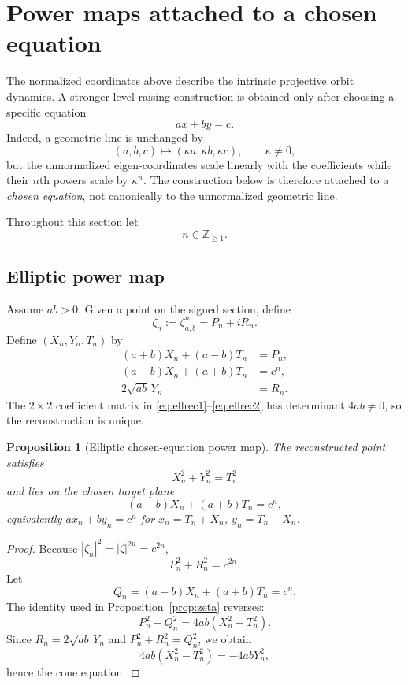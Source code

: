 \documentclass[11pt]{amsart}
\newtheorem{proposition}[theorem]{Proposition}
\theoremstyle{remark}
\begin{document}
\section{Power maps attached to a chosen equation}

The normalized coordinates above describe the intrinsic projective orbit dynamics.  A stronger level-raising construction is obtained only after choosing a specific equation
\[
ax+by=c.
\]
Indeed, a geometric line is unchanged by
\[
(a,b,c)\mapsto(\kappa a,\kappa b,\kappa c),
\qquad \kappa\ne0,
\]
but the unnormalized eigen-coordinates scale linearly with the coefficients while their $n$th powers scale by $\kappa^n$.  The construction below is therefore attached to a \emph{chosen equation}, not canonically to the unnormalized geometric line.

Throughout this section let
\[
n\in\mathbb Z_{\ge1}.
\]

\subsection{Elliptic power map}
Assume $ab>0$.  Given a point on the signed section, define
\[
\zeta_n:=\zeta_{a,b}^n=P_n+iR_n.
\]
Define $(X_n,Y_n,T_n)$ by
\begin{align}
(a+b)X_n+(a-b)T_n&=P_n,\label{eq:ellrec1}\\
(a-b)X_n+(a+b)T_n&=c^n,\label{eq:ellrec2}\\
2\sqrt{ab}\,Y_n&=R_n.\label{eq:ellrec3}
\end{align}
The $2\times2$ coefficient matrix in \eqref{eq:ellrec1}--\eqref{eq:ellrec2} has determinant $4ab\ne0$, so the reconstruction is unique.

\begin{proposition}[Elliptic chosen-equation power map]\label{prop:ellpower}
The reconstructed point satisfies
\[
X_n^2+Y_n^2=T_n^2
\]
and lies on the chosen target plane
\[
(a-b)X_n+(a+b)T_n=c^n,
\]
equivalently $ax_n+by_n=c^n$ for $x_n=T_n+X_n$, $y_n=T_n-X_n$.
\end{proposition}

\begin{proof}
Because $|\zeta_n|^2=|\zeta|^{2n}=c^{2n}$,
\[
P_n^2+R_n^2=c^{2n}.
\]
Let
\[
Q_n=(a-b)X_n+(a+b)T_n=c^n.
\]
The identity used in Proposition~\ref{prop:zeta} reverses:
\[
P_n^2-Q_n^2=4ab(X_n^2-T_n^2).
\]
Since $R_n=2\sqrt{ab}\,Y_n$ and $P_n^2+R_n^2=Q_n^2$, we obtain
\[
4ab(X_n^2-T_n^2)=-4abY_n^2,
\]
hence the cone equation.
\end{proof}
\end{document}
